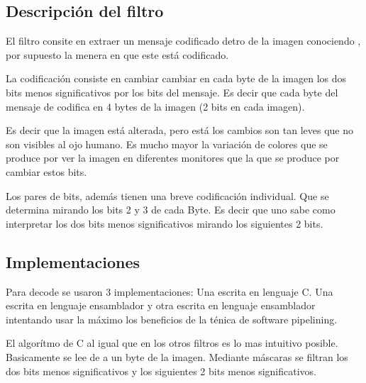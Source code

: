\subsection{Descripción del filtro}

	El filtro consite en extraer un mensaje codificado detro de la imagen conociendo
, por supuesto la menera en que este está codificado.

	La codificación consiste en cambiar cambiar en cada byte de la imagen los
dos bits menos significativos por los bits del mensaje. Es decir que cada
byte del mensaje de codifica en 4 bytes de la imagen (2 bits en cada imagen).

	Es decir que la imagen está alterada, pero está los cambios son tan leves
que no son visibles al ojo humano. Es mucho mayor la variación de colores que
se produce por ver la imagen en diferentes monitores que la que se produce
por cambiar estos bits.

	Los pares de bits, además tienen una breve codificación individual. Que
se determina mirando los bits 2 y 3 de cada Byte. Es decir que uno sabe
como interpretar los dos bits menos significativos mirando los siguientes
2 bits.


\subsection{Implementaciones}


	Para decode se usaron 3 implementaciones: Una escrita en lenguaje C.
Una escrita en lenguaje ensamblador y otra escrita en lenguaje ensamblador
intentando usar la máximo los beneficios de la ténica de software pipelining.

	El algorítmo de C al igual que en los otros filtros es lo mas intuitivo posible.
Basicamente se lee de a un byte de la imagen. Mediante máscaras se filtran los dos bits
menos significativos y los siguientes 2 bits menos significativos.

